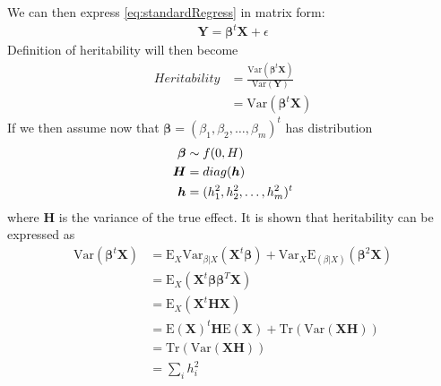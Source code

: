 			We can then express \cref{eq:standardRegress} in matrix form:
			\begin{align}
				\boldsymbol{Y}=\boldsymbol{\beta}^t\boldsymbol{X}+\epsilon
				\label{eq:matrixRegress}
			\end{align}
			Definition of heritability will then become
			\begin{align}
				Heritability& = \frac{\mathrm{Var}(\boldsymbol{\beta}^t\boldsymbol{X})}{\mathrm{Var}(\boldsymbol{Y})} \nonumber\\
				&=\mathrm{Var}(\boldsymbol{\beta}^t\boldsymbol{X})
			\end{align}
			If we then assume now that $\boldsymbol{\beta} = (\beta_1, \beta_2,\dots,\beta_m)^t$ has distribution
			\begin{align*}
				\boldsymbol{\beta}&\sim f(0,\boldmath{H})\\
				\boldsymbol{H}&=diag(\boldsymbol{h})\\
				\boldsymbol{h}&=(h_1^2,h_2^2,\dots,h_m^2)^t
			\end{align*}
			where $\boldsymbol{H}$ is the variance of the true effect. 
			It is shown that heritability can be expressed as %
			\begin{align}
			\mathrm{Var}(\boldsymbol{\beta}^t\boldsymbol{X}) &= \mathrm{E}_X\mathrm{Var}_{\beta|X}(\boldsymbol{X}^t\boldsymbol{\beta})+\mathrm{Var}_X\mathrm{E}_{(\beta|X)}(\boldsymbol{\beta}^2\boldsymbol{X}) \nonumber\\
			&=\mathrm{E}_X(\boldsymbol{X}^t\boldsymbol{\beta\beta}^T\boldsymbol{X}) \nonumber\\ 
			&= \mathrm{E}_X(\boldsymbol{X}^t\boldsymbol{HX}) \nonumber\\
			&= \mathrm{E}(\boldsymbol{X})^t\boldsymbol{H}\mathrm{E}(\boldsymbol{X})+\mathrm{Tr}(\mathrm{Var}(\boldsymbol{X}\boldsymbol{H})) \nonumber\\
			&=\mathrm{Tr}(\mathrm{Var}(\boldsymbol{X}\boldsymbol{H})) \nonumber\\
			&=\sum_ih_i^2
			\label{eq:proveHerit}
			\end{align}
			
